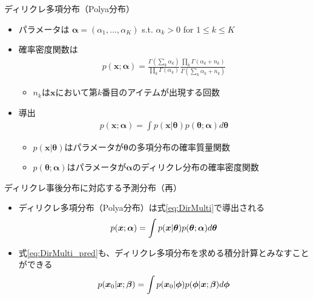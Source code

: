 \documentclass[aspectratio=169,unicode,dvipdfmx,14pt]{beamer}
\begin{document}
\begin{frame}{ディリクレ多項分布（Polya分布）}
\begin{itemize}
\item パラメータは
$\bm{\alpha} = (\alpha_1, \ldots, \alpha_K)$ s.t. $\alpha_k > 0$ for $1 \leq k \leq K$
\item 確率密度関数は
\begin{align}
p(\bm{x} ; \bm{\alpha}) = \frac{\Gamma(\sum_k \alpha_k)}{\prod_k \Gamma(\alpha_k)}
\frac{\prod_k \Gamma(\alpha_k + n_k)}{\Gamma(\sum_k \alpha_k + n_k)}
\end{align}
\vspace{-.1in}
\begin{itemize}
\item $n_k$は$\bm{x}$において第$k$番目のアイテムが出現する回数
\end{itemize}
\item 導出
\begin{align}
p(\bm{x} ; \bm{\alpha}) = \int p(\bm{x}|\bm{\theta}) p(\bm{\theta} ; \bm{\alpha}) d\bm{\theta}
\label{eq:DirMulti}
\end{align}
\vspace{-.2in}
\begin{itemize}
\item $p(\bm{x}|\bm{\theta})$はパラメータが$\bm{\theta}$の多項分布の確率質量関数
\item $p(\bm{\theta} ; \bm{\alpha})$はパラメータが$\bm{\alpha}$のディリクレ分布の確率密度関数
\end{itemize}
\end{itemize}
\end{frame}

\begin{frame}{ディリクレ事後分布に対応する予測分布（再）}
\begin{itemize}
\item ディリクレ多項分布（Polya分布）は式\eqref{eq:DirMulti}で導出される
\begin{align}
p(\bm{x} ; \bm{\alpha}) = \int p(\bm{x}|\bm{\theta}) p(\bm{\theta} ; \bm{\alpha}) d\bm{\theta}
\notag
\end{align}
\item 式\eqref{eq:DirMulti_pred}も、ディリクレ多項分布を求める積分計算とみなすことができる
\begin{align}
p(\bm{x}_0|\bm{x};\bm{\beta}) = \int p(\bm{x}_0|\bm{\phi})p(\bm{\phi}|\bm{x};\bm{\beta}) d\bm{\phi}
\notag
\end{align}
\end{itemize}

\end{frame}
\end{document}
